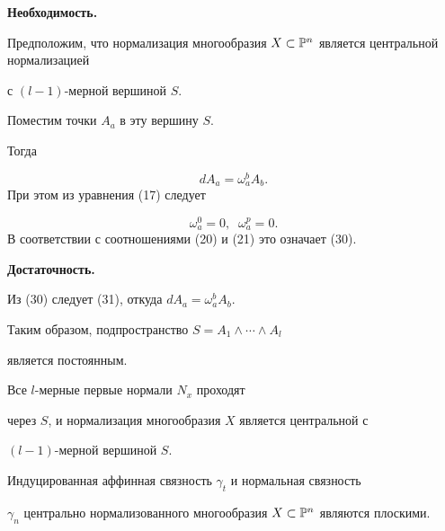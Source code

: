 \begin{pf}


{\bf Необходимость.}


 Предположим, что нормализация многообразия $X \subset


\Bbb{P}^n$ является центральной нормализацией


с $(l-1)$-мерной вершиной $S$.


 Поместим точки $A_a$ в эту вершину $S$.


Тогда


$$


d A_a = \omega_a^b A_b.


$$
При этом из уравнения (17) следует


\begin{equation}
\omega_a^0 = 0, \;\; \omega_a^p = 0.
\end{equation}
В соответствии с соотношениями (20) и (21) это означает (30).


\smallskip



{\bf Достаточность.}


Из (30) следует (31), откуда $d A_a = \omega_a^b A_b$.


Таким образом, подпространство $S = A_{1} \wedge \dotsb \wedge A_l$


является постоянным.


 Все $l$-мерные первые нормали $N_x$ проходят


через $S$, и нормализация многообразия $X$ является центральной с


$(l-1)$-мерной вершиной $S$.


\end{pf}



\begin{cornonum}
Индуцированная аффинная связность $\gamma_t$ и нормальная связность


$\gamma_n$ центрально нормализованного многообразия $X \subset


\Bbb{P}^n$ являются плоскими.


\end{cornonum}

